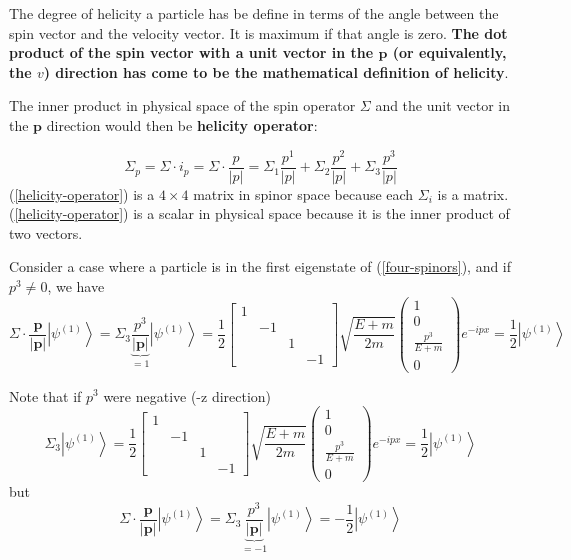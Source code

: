 The degree  of helicity a particle has be define in terms of the angle between the spin vector and the velocity vector. It is maximum if that angle is zero.\textbf{ The dot product of the spin vector with a unit vector in the $\mathbf{p}$ (or equivalently, the $v$) direction has come to be the mathematical definition of helicity}.

 The inner product in physical space of the spin operator $\Sigma$ and the unit vector in the $\mathbf{p}$ direction would then be \textbf{helicity operator}:
\begin{qt}
\begin{equation}
\Sigma_{p}=\Sigma \cdot i_{p}=\Sigma \cdot \frac{p}{|p|}=\Sigma_{1} \frac{p^{1}}{|p|}+\Sigma_{2} \frac{p^{2}}{|p|}+\Sigma_{3} \frac{p^{3}}{|p|}
\label{helicity-operator}
\end{equation}
(\ref{helicity-operator}) is a $4\times4$ matrix in spinor space because each $\Sigma_i$ is a matrix. (\ref{helicity-operator}) is a scalar in physical space because it is the inner product of two vectors.
\end{qt}
\begin{example}
Consider a case where a particle is in the first eigenstate of (\ref{four-spinors}), and if $p^3\neq0$, we have
$$
\Sigma \cdot \frac{\mathbf{p}}{|\mathbf{p}|}\left|\psi^{(1)}\right\rangle=\Sigma_{3} \underbrace{\frac{p^{3}}{|\mathbf{p}|}}_{=1}\left|\psi^{(1)}\right\rangle=\frac{1}{2}\left[\begin{array}{cccc}
{1} \\
{} & {-1} \\
{} & {} & {1} \\
{} & {} & {} & {-1}
\end{array}\right]\sqrt{\frac{E+m}{2 m}}\left(\begin{array}{c}
{1} \\
{0} \\
{\frac{p^3}{E+m}} \\
{0}
\end{array}\right)e^{-ipx}=\frac{1}{2}\left|\psi^{(1)}\right\rangle
$$
\end{example}
\begin{example}
Note that if $p^3$ were negative (-z direction)
$$
\Sigma_{3}\left|\psi^{(1)}\right\rangle=\frac{1}{2}\left[\begin{array}{cccc}
{1} \\
{} & {-1} \\
{} & {} & {1} \\
{} & {} & {} & {-1}
\end{array}\right]\sqrt{\frac{E+m}{2 m}}\left(\begin{array}{c}
{1} \\
{0} \\
{\frac{p^{3}}{E+m}} \\
{0}
\end{array}\right) e^{-i p x}=\frac{1}{2}\left|\psi^{(1)}\right\rangle
$$
but
$$
\Sigma \cdot \frac{\mathbf{p}}{|\mathbf{p}|}\left|\psi^{(1)}\right\rangle=\Sigma_{3} \underbrace{\frac{p^{3}}{|\mathbf{p}|}}_{=-1}\left|\psi^{(1)}\right\rangle=-\frac{1}{2}\left|\psi^{(1)}\right\rangle
$$
\end{example}
